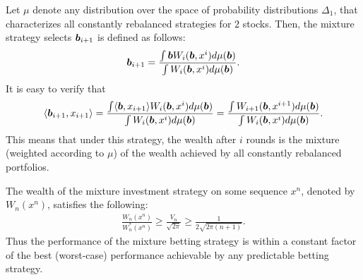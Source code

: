     Let $\mu$ denote any distribution over the space of probability distributions $\Delta_1$, that characterizes all constantly rebalanced strategies for $2$ stocks. Then, the mixture strategy selects $\boldsymbol{b}_{i+1}$  is defined as follows: 
    \begin{align}
        \boldsymbol{b}_{i+1} = \frac{\int \boldsymbol{b} W_i(\boldsymbol{b}, x^i) d\mu(\boldsymbol{b})}{\int W_i(\boldsymbol{b}, x^i) d\mu(\boldsymbol{b})}. 
    \end{align}
    It is easy to verify that 
    \begin{align}
        \langle \boldsymbol{b}_{i+1}, x_{i+1} \rangle =  \frac{\int \langle \boldsymbol{b}, x_{i+1} \rangle W_i(\boldsymbol{b}, x^i) d\mu(\boldsymbol{b})}{\int W_i(\boldsymbol{b}, x^i) d\mu(\boldsymbol{b})} =  \frac{\int  W_{i+1}(\boldsymbol{b}, x^{i+1}) d\mu(\boldsymbol{b})}{\int W_i(\boldsymbol{b}, x^i) d\mu(\boldsymbol{b})}. 
    \end{align}
    This means that under this strategy, the wealth after $i$ rounds is the mixture (weighted according to $\mu$) of the wealth achieved by all constantly rebalanced portfolios. 

    \begin{proposition}
        \label{prop:universal-portfolio-2} The wealth of the mixture investment strategy on some sequence $x^n$, denoted by $W_n(x^n)$,  satisfies the following: 
        \begin{align}
            \frac{W_n(x^n)}{W_n^*(x^n)} \geq \frac{V_n}{\sqrt{2\pi}} \geq \frac{1}{2 \sqrt{2\pi(n+1)}}. 
        \end{align}
        Thus the performance of the mixture betting strategy is within a constant factor of the best (worst-case) performance achievable by any predictable betting strategy. 
    \end{proposition}

